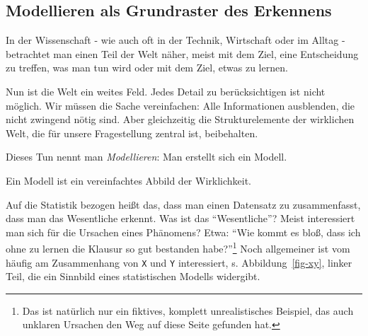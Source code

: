 \documentclass[
  a4paper,
  DIV=11]{scrreprt}
\theoremstyle{definition}
\theoremstyle{remark}
\begin{document}
\hypertarget{modellieren-als-grundraster-des-erkennens}{%
\subsection{Modellieren als Grundraster des
Erkennens}\label{modellieren-als-grundraster-des-erkennens}}

In der Wissenschaft - wie auch oft in der Technik, Wirtschaft oder im
Alltag - betrachtet man einen Teil der Welt näher, meist mit dem Ziel,
eine Entscheidung zu treffen, was man tun wird oder mit dem Ziel, etwas
zu lernen.

Nun ist die Welt ein weites Feld. Jedes Detail zu berücksichtigen ist
nicht möglich. Wir müssen die Sache vereinfachen: Alle Informationen
ausblenden, die nicht zwingend nötig sind. Aber gleichzeitig die
Strukturelemente der wirklichen Welt, die für unsere Fragestellung
zentral ist, beibehalten.

Dieses Tun nennt man \emph{Modellieren}: Man erstellt sich ein Modell.

\begin{tcolorbox}[enhanced jigsaw, leftrule=.75mm, toptitle=1mm, bottomtitle=1mm, titlerule=0mm, breakable, colframe=quarto-callout-important-color-frame, title=\textcolor{quarto-callout-important-color}{\faExclamation}\hspace{0.5em}{Wichtig}, rightrule=.15mm, colback=white, arc=.35mm, left=2mm, bottomrule=.15mm, coltitle=black, opacitybacktitle=0.6, toprule=.15mm, colbacktitle=quarto-callout-important-color!10!white, opacityback=0]
Ein Modell ist ein vereinfachtes Abbild der Wirklichkeit.
\end{tcolorbox}

Auf die Statistik bezogen heißt das, dass man einen Datensatz zu
zusammenfasst, dass man das Wesentliche erkennt. Was ist das
``Wesentliche''? Meist interessiert man sich für die Ursachen eines
Phänomens? Etwa: ``Wie kommt es bloß, dass ich ohne zu lernen die
Klausur so gut bestanden habe?''\footnote{Das ist natürlich nur ein
  fiktives, komplett unrealistisches Beispiel, das auch unklaren
  Ursachen den Weg auf diese Seite gefunden hat.} Noch allgemeiner ist
vom häufig am Zusammenhang von \texttt{X} und \texttt{Y} interessiert,
s. Abbildung~\ref{fig-xy}, linker Teil, die ein Sinnbild eines
statistischen Modells widergibt.
\end{document}
